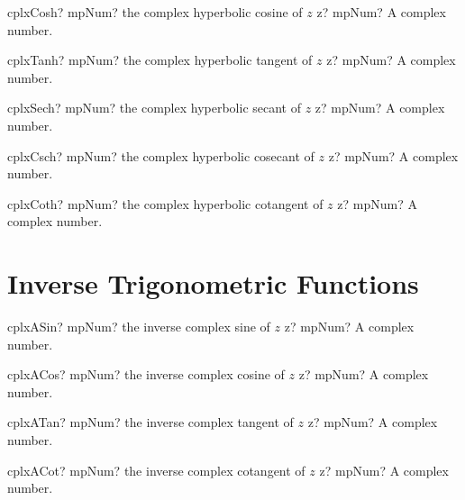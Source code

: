 \documentclass[12pt,a4paper,openany]{book}
\begin{document}
\begin{mpFunctionsExtract}
\mpFunctionOne
{cplxCosh? mpNum? the complex hyperbolic cosine of $z$}
{z? mpNum? A complex number.}
\end{mpFunctionsExtract}

\begin{mpFunctionsExtract}
\mpFunctionOne
{cplxTanh? mpNum? the complex hyperbolic tangent of $z$}
{z? mpNum? A complex number.}
\end{mpFunctionsExtract}

\begin{mpFunctionsExtract}
\mpFunctionOne
{cplxSech? mpNum? the complex hyperbolic secant of $z$}
{z? mpNum? A complex number.}
\end{mpFunctionsExtract}

\begin{mpFunctionsExtract}
\mpFunctionOne
{cplxCsch? mpNum? the complex hyperbolic cosecant of $z$}
{z? mpNum? A complex number.}
\end{mpFunctionsExtract}

\begin{mpFunctionsExtract}
\mpFunctionOne
{cplxCoth? mpNum? the complex hyperbolic cotangent of $z$}
{z? mpNum? A complex number.}
\end{mpFunctionsExtract}

\section{Inverse Trigonometric Functions}

\begin{mpFunctionsExtract}
\mpFunctionOne
{cplxASin? mpNum? the inverse complex sine of $z$}
{z? mpNum? A complex number.}
\end{mpFunctionsExtract}

\begin{mpFunctionsExtract}
\mpFunctionOne
{cplxACos? mpNum? the inverse complex cosine of $z$}
{z? mpNum? A complex number.}
\end{mpFunctionsExtract}

\begin{mpFunctionsExtract}
\mpFunctionOne
{cplxATan? mpNum? the inverse complex tangent of $z$}
{z? mpNum? A complex number.}
\end{mpFunctionsExtract}

\begin{mpFunctionsExtract}
\mpFunctionOne
{cplxACot? mpNum? the inverse complex cotangent of $z$}
{z? mpNum? A complex number.}
\end{mpFunctionsExtract}
\end{document}

